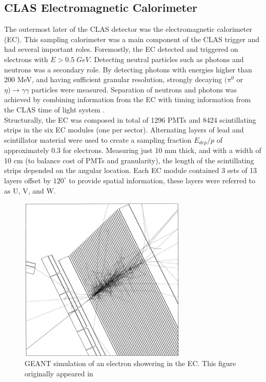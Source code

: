 \subsection{CLAS Electromagnetic Calorimeter}
The outermost later of the CLAS detector was the electromagnetic calorimeter (EC).  This sampling calorimeter was a main component of the CLAS trigger and had several important roles.  Foremostly, the EC detected and triggered on electrons with $E > 0.5 \; GeV$.  Detecting neutral particles such as photons and neutrons was a secondary role.  By detecting photons with energies higher than 200 MeV, and having sufficient granular resolution, strongly decaying $(\pi^0$ or $\eta) \rightarrow \gamma \gamma$ particles were measured.  Separation of neutrons and photons was achieved by combining information from the EC with timing information from the CLAS time of light system \cite{hardware-amarian:2001}.  \\
Structurally, the EC was composed in total of 1296 PMTs and 8424 scintillating strips in the six EC modules (one per sector).  Alternating layers of lead and scintillator material were used to create a sampling fraction $E_{dep}/p$ of approximately 0.3 for electrons.  Measuring just 10 mm thick, and with a width of 10 cm (to balance cost of PMTs and granularity), the length of the scintillating strips depended on the angular location.  Each EC module contained 3 sets of 13 layers offset by $120^\circ$ to provide spatial information, these layers were referred to as U, V, and W.  

\begin{figure}
	\centering
		\includegraphics[width=8cm]{image/diagrams/ec-shower-geant.png}
		\caption{GEANT simulation of an electron showering in the EC.  This figure originally appeared in \cite{hardware-amarian:2001}}
\end{figure}
